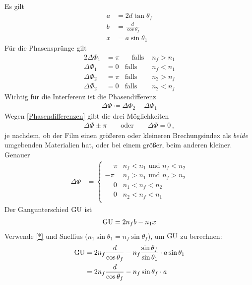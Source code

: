 \begin{enumerate}[a)]
  Es gilt
  \begin{align}\label{*}
    a &= 2d\tan\theta_f \\\nonumber
    b &= \frac{d}{\cos\theta_f}\\\nonumber
    x &= a\sin\theta_1
  \end{align}
  Für die Phasensprünge gilt
  \begin{alignat}{2}\label{Phasendifferenzen}
    \Delta\Phi_1 &= \pi &\quad\text{falls } &n_f>n_1\\\nonumber
    \Delta\Phi_1 &= 0   &\text{falls } &n_f<n_1\\\nonumber
    \Delta\Phi_2 &= \pi &\text{falls } &n_2>n_f\\\nonumber
    \Delta\Phi_2 &= 0   &\text{falls } &n_2<n_f
  \end{alignat}
  Wichtig für die Interferenz ist die Phasendifferenz
  \begin{gather*}
    \Delta\Phi \coloneqq \Delta\Phi_2 - \Delta\Phi_1
  \end{gather*}
  Wegen \eqref{Phasendifferenzen} gibt die drei Möglichkeiten
  \begin{gather*}
    \Delta\Phi \pm \pi  
    \qquad\text{oder}\qquad 
    \Delta\Phi = 0\,,
  \end{gather*}
  je nachdem, ob der Film einen größeren oder
  kleineren Brechungsindex als \emph{beide} umgebenden Materialien hat,
  oder bei einem größer, beim anderen kleiner. Genauer
  \begin{align*}
    \Delta\Phi 
    &=
      \begin{cases}
        \phantom{-}\pi & n_f<n_1\text{ und }n_f<n_2\\
        -\pi           & n_f>n_1\text{ und }n_f>n_2\\
        \phantom{-}0   & n_1<n_f<n_2\\ 
        \phantom{-}0   & n_2<n_f<n_1\\
      \end{cases}
  \end{align*}
  Der Gangunterschied $\operatorname{GU}$ ist
  \begin{gather*}
    \operatorname{GU} = 2n_f b - n_1x 
  \end{gather*}
  Verwende \eqref{*} und Snellius ($n_1\sin\theta_1 = n_f\sin\theta_f$),
  um $\operatorname{GU}$ zu berechnen:
  \begin{align*}
    \GU &= 2 n_f\frac{d}{\cos\theta_f} 
          - n_f\frac{\sin\theta_f}{\sin\theta_1} \cdot a\sin\theta_1\\
        &= 2 n_f\frac{d}{\cos\theta_f} - n_f\sin\theta_f \cdot a\\

\end{align*}
\end{enumerate}
